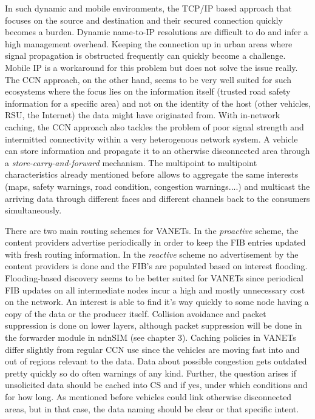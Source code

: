 In such dynamic and mobile environments, the TCP/IP based approach that focuses on the source and destination and their secured connection quickly becomes a burden. Dynamic name-to-IP resolutions are difficult to do and infer a high management overhead. Keeping the connection up in urban areas where signal propagation is obstructed frequently can quickly become a challenge. Mobile IP is a workaround for this problem but does not solve the issue really. The CCN approach, on the other hand, seems to be very well suited for such ecosystems where the focus lies on the information itself (trusted road safety information for a specific area) and not on the identity of the host (other vehicles, RSU, the Internet) the data might have originated from. With in-network caching, the CCN approach also tackles the problem of poor signal strength and intermitted connectivity within a very heterogenous network system. A vehicle can store information and propagate it to an otherwise disconnected area through a \emph{store-carry-and-forward} mechanism. The multipoint to multipoint characteristics already mentioned before allows to aggregate the same interests (maps, safety warnings, road condition, congestion warnings....) and multicast the arriving data through different faces and different channels back to the consumers simultaneously.

\vspace{5mm} %

There are two main routing schemes for VANETs. In the \emph{proactive} scheme, the content providers advertise periodically in order to keep the FIB entries updated with fresh routing information. In the \emph{reactive} scheme no advertisement by the content providers is done and the FIB's are populated based on interest flooding. Flooding-based discovery seems to be better suited for VANETs since periodical FIB updates on all intermediate nodes incur a high and mostly unnecessary cost on the network. An interest is able to find it's way quickly to some node having a copy of the data or the producer itself. Collision avoidance and packet suppression is done on lower layers, although packet suppression will be done in the forwarder module in ndnSIM (see chapter 3).
Caching policies in VANETs differ slightly from regular CCN use since the vehicles are moving fast into and out of regions relevant to the data. Data about possible congestion gets outdated pretty quickly so do often warnings of any kind. Further, the question arises if unsolicited data should be cached into CS and if yes, under which conditions and for how long. As mentioned before vehicles could link otherwise disconnected areas, but in that case, the data naming should be clear or that specific intent.

